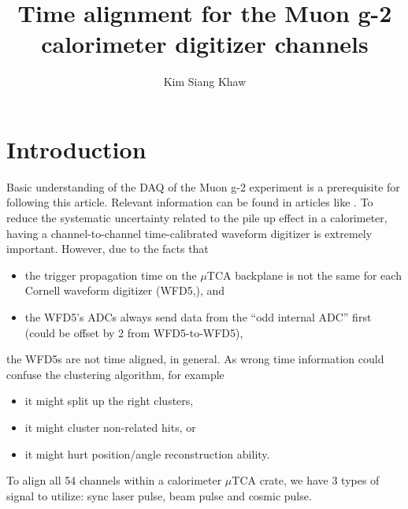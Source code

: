 


\title{Time alignment for the Muon g-2 calorimeter digitizer channels}
\author{Kim Siang Khaw}


\maketitle
{}

\tableofcontents

\section{Introduction}

Basic understanding of the DAQ of the Muon g-2 experiment is a prerequisite for following this article. Relevant information can be found in articles like \cite{daq,rider,fc7,amc13}. To reduce the systematic uncertainty related to the pile up effect in a calorimeter, having a channel-to-channel time-calibrated waveform digitizer is extremely important. However, due to the facts that 
\begin{itemize}
\item {the trigger propagation time on the $\mu$TCA backplane is not the same for each Cornell waveform digitizer (WFD5,\cite{rider}), and}
\item {the WFD5’s ADCs always send data from the “odd internal ADC” first (could be offset by 2 from WFD5-to-WFD5),}
\end{itemize}
the WFD5s are not time aligned, in general.
As wrong time information could confuse the clustering algorithm, for example
\begin{itemize}
\item{it might split up the right clusters,}
\item{it might cluster non-related hits, or}
\item{it might hurt position/angle reconstruction ability.}
\end{itemize}
To align all 54 channels within a calorimeter $\mu$TCA crate, we have 3 types of signal to utilize: sync laser pulse, beam pulse and cosmic pulse. 

